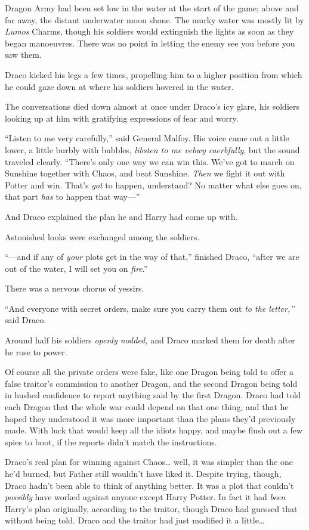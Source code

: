 Dragon Army had been set low in the water at the start of the game;
above and far away, the distant underwater moon shone. The murky water
was mostly lit by \emph{Lumos} Charms, though his soldiers would
extinguish the lights as soon as they began manoeuvres. There was no
point in letting the enemy see you before you saw them.

Draco kicked his legs a few times, propelling him to a higher position
from which he could gaze down at where his soldiers hovered in the
water.

The conversations died down almost at once under Draco's icy glare, his
soldiers looking up at him with gratifying expressions of fear and
worry.

``Listen to me very carefully,'' said General Malfoy. His voice came out
a little lower, a little burbly with bubbles, \emph{libsten to me vebwy
caerbfully}, but the sound traveled clearly. ``There's only one way we
can win this. We've got to march on Sunshine together with Chaos, and
beat Sunshine. \emph{Then} we fight it out with Potter and win. That's
\emph{got} to happen, understand? No matter what else goes on, that part
\emph{has} to happen that way---''

And Draco explained the plan he and Harry had come up with.

Astonished looks were exchanged among the soldiers.

``---and if any of \emph{your} plots get in the way of that,'' finished
Draco, ``after we are out of the water, I will set you on \emph{fire}.''

There was a nervous chorus of yessirs.

``And everyone with secret orders, make sure you carry them out \emph{to
the letter,''} said Draco.

Around half his soldiers \emph{openly nodded,} and Draco marked them for
death after he rose to power.

Of course all the private orders were fake, like one Dragon being told
to offer a false traitor's commission to another Dragon, and the second
Dragon being told in hushed confidence to report anything said by the
first Dragon. Draco had told each Dragon that the whole war could depend
on that one thing, and that he hoped they understood it was more
important than the plans they'd previously made. With luck that would
keep all the idiots happy, and maybe flush out a few spies to boot, if
the reports didn't match the instructions.

Draco's real plan for winning against Chaos\ldots{} well, it was simpler
than the one he'd burned, but Father still wouldn't have liked it.
Despite trying, though, Draco hadn't been able to think of anything
better. It was a plot that couldn't \emph{possibly} have worked against
anyone except Harry Potter. In fact it had \emph{been} Harry's plan
originally, according to the traitor, though Draco had guessed that
without being told. Draco and the traitor had just modified it a
little\ldots{}

